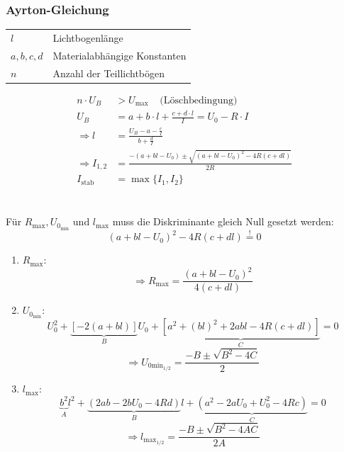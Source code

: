 \documentclass[a4paper,twocolumn,10pt]{article}
\newcommand{\sollsein}{\stackrel{!}{=}}
\begin{document}
\subsubsection{Ayrton-Gleichung}
\begin{tabular}{ll}
$l$ & Lichtbogenlänge\\
$a,b,c,d$ & Materialabhängige Konstanten\\
$n$ & Anzahl der Teillichtbögen
\end{tabular}
\begin{equation*}
\begin{split}
n\cdot U_B&>U_{\text{max}}\;\;\;\;\text{(Löschbedingung)}\\
U_B&=a+b\cdot l+\frac{c+d\cdot l}{I}=U_0-R\cdot I\\
\Rightarrow l&=\frac{U_B-a-\frac{c}{I}}{b+\frac{d}{I}}\\
\Rightarrow I_{1,2}&=\frac{-(a+bl-U_0)\pm\sqrt{(a+bl-U_0)^2-4R(c+dl)}}{2R}\\
I_{\text{stab}}&=\max\{I_1,I_2\}
\end{split}
\end{equation*}\\\\
Für $R_{\text{max}}, U_{0_{\text{min}}}$ und $l_{\text{max}}$ muss die Diskriminante gleich Null gesetzt werden:
\begin{equation*}
(a+bl-U_0)^2-4R(c+dl)\sollsein 0
\end{equation*}
\begin{enumerate}[label=$\bullet$]
\item $R_{\text{max}}$:
\begin{equation*}
\Rightarrow R_{\text{max}}=\frac{(a+bl-U_0)^2}{4(c+dl)}
\end{equation*}
\item $U_{0_{\text{min}}}$:
\begin{equation*}
U_0^2+\underbrace{[-2(a+bl)]}_{B}U_0+\underbrace{[a^2+(bl)^2+2abl-4R(c+dl)]}_{C}=0
\end{equation*}
\begin{equation*}
\Rightarrow U_{0\text{min}_{1/2}}=\frac{-B\pm\sqrt{B^2-4C}}{2}
\end{equation*}
\item $l_{\text{max}}$:
\begin{equation*}
\underbrace{b^2}_{A}l^2+\underbrace{(2ab-2bU_0-4Rd)}_{B}l+\underbrace{(a^2-2aU_0+U_0^2-4Rc)}_{C}=0
\end{equation*}
\begin{equation*}
\Rightarrow l_{\text{max}_{1/2}}=\frac{-B\pm\sqrt{B^2-4AC}}{2A}
\end{equation*}
\end{enumerate}
\end{document}
